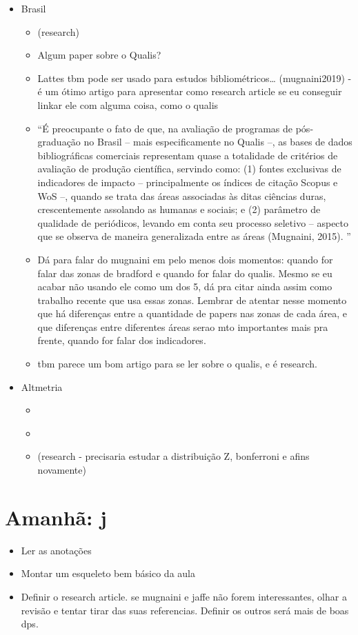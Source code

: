 \documentclass[11pt]{article}
\begin{document}
\begin{itemize}
\item Brasil
\begin{itemize}
\item \cite{mugnaini2019} (research)
\item Algum paper sobre o Qualis?
\item Lattes tbm pode ser usado para estudos bibliométricos\ldots{} (mugnaini2019) - é um ótimo artigo para apresentar como research article se eu conseguir linkar ele com alguma coisa, como o qualis
\item ``É preocupante o fato de que, na avaliação de programas de pós-graduação no Brasil – mais especificamente no Qualis –, as bases de dados bibliográficas comerciais representam quase a totalidade de critérios de avaliação de produção científica, servindo como: (1) fontes exclusivas de indicadores de impacto – principalmente os índices de citação Scopus e WoS –, quando se trata das áreas associadas às ditas ciências duras, crescentemente assolando as humanas e sociais; e (2) parâmetro de qualidade de periódicos, levando em conta seu processo seletivo – aspecto que se observa de maneira generalizada entre as áreas (Mugnaini, 2015). ''
\item Dá para falar do mugnaini em pelo menos dois momentos: quando for falar das zonas de bradford e quando for falar do qualis. Mesmo se eu acabar não usando ele como um dos 5, dá pra citar ainda assim como trabalho recente que usa essas zonas. Lembrar de atentar nesse momento que há diferenças entre a quantidade de papers nas zonas de cada área, e que diferenças entre diferentes áreas serao mto importantes mais pra frente, quando for falar dos indicadores.
\item \cite{jaffe2020} tbm parece um bom artigo para se ler sobre o qualis, e é research.
\end{itemize}
\end{itemize}


\begin{itemize}
\item Altmetria
\begin{itemize}
\item \cite{bornmann2014}
\item \cite{williams2017}
\item \cite{thelwall2013} (research - precisaria estudar a distribuição Z, bonferroni e afins novamente)
\end{itemize}
\end{itemize}


\section{Amanhã: j}
\label{sec:org40657ac}
\begin{itemize}
\item Ler as anotações
\item Montar um esqueleto bem básico da aula
\item Definir o research article. se mugnaini e jaffe não forem interessantes, olhar a revisão e tentar tirar das suas referencias. Definir os outros será mais de boas dps.
\end{itemize}






\end{document}
